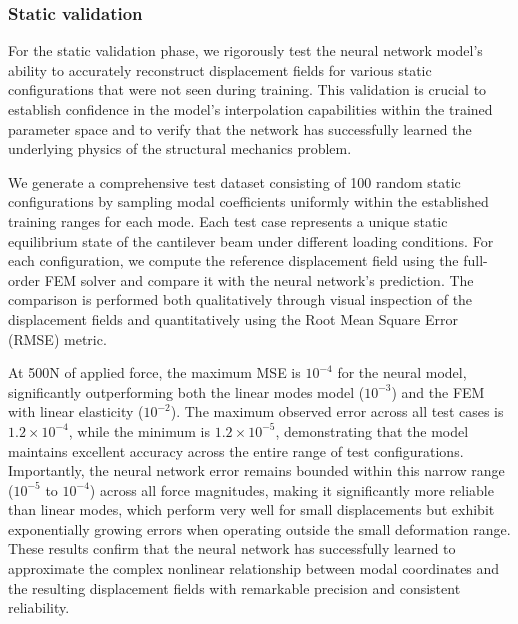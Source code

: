 \subsubsection{Static validation}
\label{sec:static_validation}
For the static validation phase, we rigorously test the neural network model's ability to accurately reconstruct displacement fields for various static configurations that were not seen during training. This validation is crucial to establish confidence in the model's interpolation capabilities within the trained parameter space and to verify that the network has successfully learned the underlying physics of the structural mechanics problem.

We generate a comprehensive test dataset consisting of 100 random static configurations by sampling modal coefficients uniformly within the established training ranges for each mode. Each test case represents a unique static equilibrium state of the cantilever beam under different loading conditions. For each configuration, we compute the reference displacement field using the full-order FEM solver and compare it with the neural network's prediction. The comparison is performed both qualitatively through visual inspection of the displacement fields and quantitatively using the Root Mean Square Error (RMSE) metric.

At 500N of applied force, the maximum MSE is $10^{-4}$ for the neural model, significantly outperforming both the linear modes model ($10^{-3}$) and the FEM with linear elasticity ($10^{-2}$). The maximum observed error across all test cases is $1.2 \times 10^{-4}$, while the minimum is $1.2 \times 10^{-5}$, demonstrating that the model maintains excellent accuracy across the entire range of test configurations. Importantly, the neural network error remains bounded within this narrow range ($10^{-5}$ to $10^{-4}$) across all force magnitudes, making it significantly more reliable than linear modes, which perform very well for small displacements but exhibit exponentially growing errors when operating outside the small deformation range. These results confirm that the neural network has successfully learned to approximate the complex nonlinear relationship between modal coordinates and the resulting displacement fields with remarkable precision and consistent reliability.

